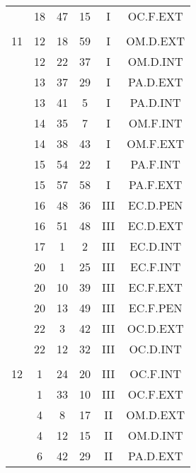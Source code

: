 \documentclass[12pt, a4paper]{article}
\begin{document}
\begin{multicols}{3}
{\begin{tabular}{c c c c c c}
	 	 	 	 & 18 & 47 & 15 & I & OC.F.EXT\\%
	 	 	 	 & & & & & \\%
	 	 	 	11 & 12 & 18 & 59 & I & OM.D.EXT\\%
	 	 	 	 & 12 & 22 & 37 & I & OM.D.INT\\%
	 	 	 	 & 13 & 37 & 29 & I & PA.D.EXT\\%
	 	 	 	 & 13 & 41 & 5 & I & PA.D.INT\\%
	 	 	 	 & 14 & 35 & 7 & I & OM.F.INT\\%
	 	 	 	 & 14 & 38 & 43 & I & OM.F.EXT\\%
	 	 	 	 & 15 & 54 & 22 & I & PA.F.INT\\%
	 	 	 	 & 15 & 57 & 58 & I & PA.F.EXT\\%
	 	 	 	 & 16 & 48 & 36 & III & EC.D.PEN\\%
	 	 	 	 & 16 & 51 & 48 & III & EC.D.EXT\\%
	 	 	 	 & 17 & 1 & 2 & III & EC.D.INT\\%
	 	 	 	 & 20 & 1 & 25 & III & EC.F.INT\\%
	 	 	 	 & 20 & 10 & 39 & III & EC.F.EXT\\%
	 	 	 	 & 20 & 13 & 49 & III & EC.F.PEN\\%
	 	 	 	 & 22 & 3 & 42 & III & OC.D.EXT\\%
	 	 	 	 & 22 & 12 & 32 & III & OC.D.INT\\%
	 	 	 	 & & & & & \\%
	 	 	 	12 & 1 & 24 & 20 & III & OC.F.INT\\%
	 	 	 	 & 1 & 33 & 10 & III & OC.F.EXT\\%
	 	 	 	 & 4 & 8 & 17 & II & OM.D.EXT\\%
	 	 	 	 & 4 & 12 & 15 & II & OM.D.INT\\%
	 	 	 	 & 6 & 42 & 29 & II & PA.D.EXT\\%
	 	 \end{tabular}
 	}
\end{multicols}
\end{document}
